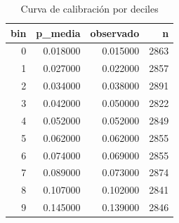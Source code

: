 \begin{table}[htbp]
\caption{Curva de calibración por deciles}
\label{tab:tabla_25_curva_calibracion}
\begin{tabular}{rrrr}
\toprule
bin & p\_media & observado & n \\
\midrule
0 & 0.018000 & 0.015000 & 2863 \\
1 & 0.027000 & 0.022000 & 2857 \\
2 & 0.034000 & 0.038000 & 2891 \\
3 & 0.042000 & 0.050000 & 2822 \\
4 & 0.052000 & 0.052000 & 2849 \\
5 & 0.062000 & 0.062000 & 2855 \\
6 & 0.074000 & 0.069000 & 2855 \\
7 & 0.089000 & 0.073000 & 2874 \\
8 & 0.107000 & 0.102000 & 2841 \\
9 & 0.145000 & 0.139000 & 2846 \\
\bottomrule
\end{tabular}
\end{table}
